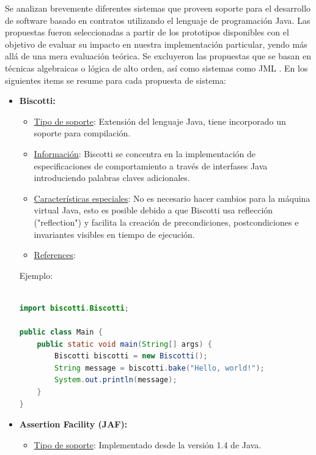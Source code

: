 Se analizan brevemente diferentes sistemas que proveen soporte para el desarrollo de software basado en contratos utilizando el lenguaje de programación Java. Las propuestas fueron seleccionadas a partir de los prototipos disponibles con el objetivo de evaluar su impacto en nuestra implementación particular, yendo más allá de una mera evaluación teórica. Se excluyeron las propuestas que se basan en técnicas algebraicas o lógica de alto orden, así como sistemas como JML \cite{Leavens99}. En los siguientes items se resume para cada propuesta de sistema:

\begin{itemize}

\item \textbf{Biscotti:}

\begin{itemize}
\item \underline{Tipo de soporte}: Extensión del lenguaje Java, tiene incorporado un soporte para compilación.
\item \underline{Información}: Biscotti se concentra en la implementación de especificaciones de comportamiento a través de interfases Java introduciendo palabras claves adicionales. 

\item \underline{Características especiales}: No es necesario hacer cambios para la máquina virtual Java, esto es posible debido a que Biscotti usa reflección ("reflection") y facilita la creación de precondiciones, postcondiciones e invariantes visibles en tiempo de ejecución.

\item \underline{References}: \cite{Cicalese99}
\end{itemize}

Ejemplo: 

\begin{lstlisting}[language=Java]

import biscotti.Biscotti;

public class Main {
    public static void main(String[] args) {
        Biscotti biscotti = new Biscotti();
        String message = biscotti.bake("Hello, world!");
        System.out.println(message);
    }
}
\end{lstlisting}


\item \textbf{Assertion Facility (JAF):}

\begin{itemize}

    \item \underline{Tipo de soporte}: Implementado desde la versión 1.4 de Java. 


\end{itemize}
\end{itemize}
